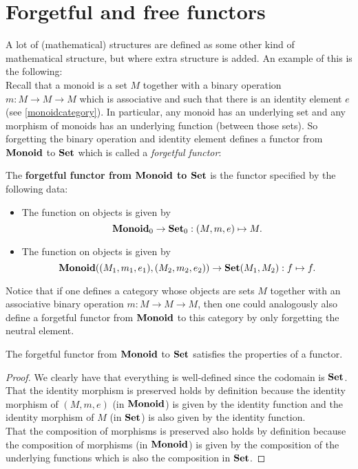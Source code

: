 
\section{Forgetful and free functors}
A lot of (mathematical) structures are defined as some other kind of mathematical structure, but where extra structure is added. An example of this is the following:\\
Recall that a monoid is a set $M$ together with a binary operation $m:M\to M\to M$ which is associative and such that there is an identity element $e$ (see \cref{monoidcategory}). In particular, any monoid has an underlying set and any morphism of monoids has an underlying function (between those sets). So forgetting the binary operation and identity element defines a functor from $\mathbf{Monoid}$ to $\mathbf{Set}$ which is called a \textit{forgetful functor}:
\begin{exa}\label{example:forgetful_montoset} The \textbf{forgetful functor from $\mathbf{Monoid}$ to $\mathbf{Set}$} is the functor specified by the following data:
\begin{itemize}
\item The function on objects is given by 
\[
{\mathbf{Monoid}}_0\to {\mathbf{Set}}_0: (M,m,e)\mapsto M.
\]
\item The function on objects is given by
\[
{\mathbf{Monoid}}((M_1,m_1,e_1),(M_2,m_2,e_2)) \to {\mathbf{Set}}(M_1,M_2) : f\mapsto f.
\]
\end{itemize}
\end{exa}
Notice that if one defines a category whose objects are sets $M$ together with an associative binary operation $m:M\to M\to M$, then one could analogously also define a forgetful functor from $\mathbf{Monoid}$ to this category by only forgetting the neutral element.

\begin{lemma} The forgetful functor from $\mathbf{Monoid}$ to $\mathbf{Set}$ satisfies the properties of a functor.
\begin{proof}
We clearly have that everything is well-defined since the codomain is $\mathbf{Set}$.\\
That the identity morphism is preserved holds by definition because the identity morphism of $(M,m,e)$ (in $\mathbf{Monoid}$) is given by the identity function and the identity morphism of $M$ (in $\mathbf{Set}$) is also given by the identity function.\\
That the composition of morphisms is preserved also holds by definition because the composition of morphisms (in $\mathbf{Monoid}$) is given by the composition of the underlying functions which is also the composition in $\mathbf{Set}$.
\end{proof}
\end{lemma}

